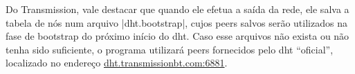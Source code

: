 Do Transmission, vale destacar que quando ele efetua a saída da rede, ele salva a tabela
de nós num arquivo \sverb|dht.bootstrap|, cujos \glspl*{peer} salvos serão utilizados na
fase de \gls*{bootstrap} do próximo início do \gls*{dht}. Caso esse arquivos não exista
ou não tenha sido suficiente, o programa utilizará \glspl*{peer} fornecidos pelo
\gls*{dht} ``oficial'', localizado no endereço \url{dht.transmissionbt.com:6881}.